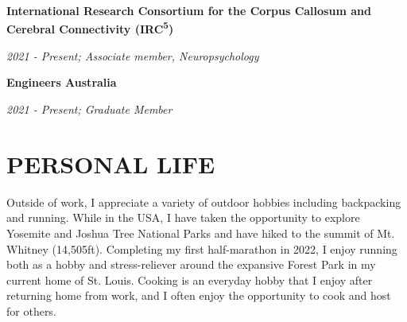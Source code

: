 \documentclass{article}
\begin{document}
  \large\textbf{International Research Consortium for the Corpus Callosum and Cerebral Connectivity (IRC\textsuperscript{5})}

  \textit{2021 - Present; Associate member, Neuropsychology}

  \medbreak

  \large\textbf{Engineers Australia}

  \textit{2021 - Present; Graduate Member}

  \section*{\centering\uppercase{Personal Life}}

  Outside of work, I appreciate a variety of outdoor hobbies including backpacking and running. While in the USA, I have taken the opportunity to explore Yosemite and Joshua Tree National Parks and have hiked to the summit of Mt. Whitney (14,505ft). Completing my first half-marathon in 2022, I enjoy running both as a hobby and stress-reliever around the expansive Forest Park in my current home of St. Louis. Cooking is an everyday hobby that I enjoy after returning home from work, and I often enjoy the opportunity to cook and host for others.
\end{document}
